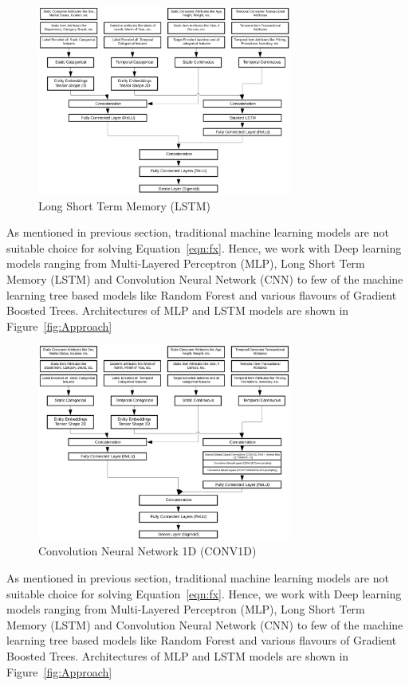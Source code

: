   \begin{figure}[t]
    \centering 
    \includegraphics[width=3.3in]{img/LSTM.png} 
    \caption{Long Short Term Memory (LSTM)} 
    \label{fig:LSTM} 
  \end{figure}
As mentioned in previous section, traditional machine learning models are not suitable choice for solving Equation~\ref{eqn:fx}. 
Hence, we work with Deep learning models ranging from Multi-Layered Perceptron (MLP), Long Short 
Term Memory (LSTM) and Convolution Neural Network (CNN) to few of the machine learning tree based models like Random 
Forest and various flavours of Gradient Boosted Trees. Architectures of MLP and LSTM models are shown in Figure~\ref{fig:Approach}

  \begin{figure}[t]
    \centering 
    \includegraphics[width=3.3in]{img/CONV1D.png} 
    \caption{Convolution Neural Network 1D (CONV1D)} 
    \label{fig:CONV1D} 
  \end{figure}
As mentioned in previous section, traditional machine learning models are not suitable choice for solving Equation~\ref{eqn:fx}. 
Hence, we work with Deep learning models ranging from Multi-Layered Perceptron (MLP), Long Short 
Term Memory (LSTM) and Convolution Neural Network (CNN) to few of the machine learning tree based models like Random 
Forest and various flavours of Gradient Boosted Trees. Architectures of MLP and LSTM models are shown in Figure~\ref{fig:Approach}

